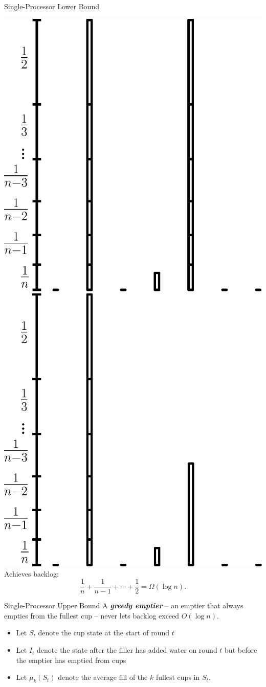 \documentclass[xcolor=x11names, svgnames, rgb]{beamer}
\newcommand{\defn}[1]       {{\textit{\textbf{\boldmath #1}}}}
\begin{document}
\begin{frame}[t]{Single-Processor Lower Bound}
\begin{overprint}
    \includegraphics[width=0.5\linewidth]{singleProcessorLowerBound/round_6_0.eps}
    \includegraphics[width=0.5\linewidth]{singleProcessorLowerBound/round_6_1.eps}
    \vspace{1.5cm}Achieves backlog: $$\frac{1}{n} + \frac{1}{n-1} + \cdots + \frac{1}{2} = \Omega(\log n).$$ 
  \end{overprint}
\end{frame}

\begin{frame}[t]{Single-Processor Upper Bound}
  A \defn{greedy emptier} -- an emptier that always empties from the
    fullest cup -- never lets backlog exceed $O(\log n)$.

  \vspace{0.75cm}
  \begin{definitions}
  \begin{itemize}
    \item Let $S_t$ denote the cup state at the start of round $t$
    \item Let $I_t$ denote the state after the filler has added water on round $t$ but before the emptier has emptied from cups
    \item Let $\mu_k(S_t)$ denote the average fill of the $k$ fullest cups in $S_t$.
  \end{itemize}
  \end{definitions}
\end{frame}
\end{document}
